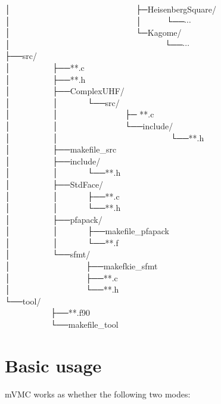 │~~~~~~~~~~~~~~~~~~~~~~~~~~~~~~├─HeisenbergSquare/\\
│~~~~~~~~~~~~~~~~~~~~~~~~~~~~~~│~~~~~~└──$\cdots$\\
│~~~~~~~~~~~~~~~~~~~~~~~~~~~~~~└─Kagome/\\
│~~~~~~~~~~~~~~~~~~~~~~~~~~~~~~~~~~~~~└──$\cdots$\\
├──src/\\
│~~~~~~~~~~├──**.c\\
│~~~~~~~~~~├──**.h\\
│~~~~~~~~~~├──ComplexUHF/\\
│~~~~~~~~~~│~~~~~~~└──src/\\
│~~~~~~~~~~│~~~~~~~~~~~~~~~~├─ **.c\\
│~~~~~~~~~~│~~~~~~~~~~~~~~~~└──include/\\
│~~~~~~~~~~│~~~~~~~~~~~~~~~~~~~~~~~~~~~└──**.h\\
│~~~~~~~~~~├──makefile\_src\\
│~~~~~~~~~~├──include/\\
│~~~~~~~~~~│~~~~~~~└──**.h\\
│~~~~~~~~~~├──StdFace/\\
│~~~~~~~~~~│~~~~~~~├──**.c\\
│~~~~~~~~~~│~~~~~~~└──**.h\\
│~~~~~~~~~~├──pfapack/\\
│~~~~~~~~~~│~~~~~~~├──makefile\_pfapack\\
│~~~~~~~~~~│~~~~~~~└──**.f\\
│~~~~~~~~~~└──sfmt/\\
│~~~~~~~~~~~~~~~~~~├──makefkie\_sfmt\\
│~~~~~~~~~~~~~~~~~~├──**.c\\
│~~~~~~~~~~~~~~~~~~└──**.h\\
└──tool/\\
~~~~~~~~~~~├──**.f90\\
~~~~~~~~~~~└──makefile\_tool\\

\newpage
\section{Basic usage}

mVMC works as whether the following two modes:


